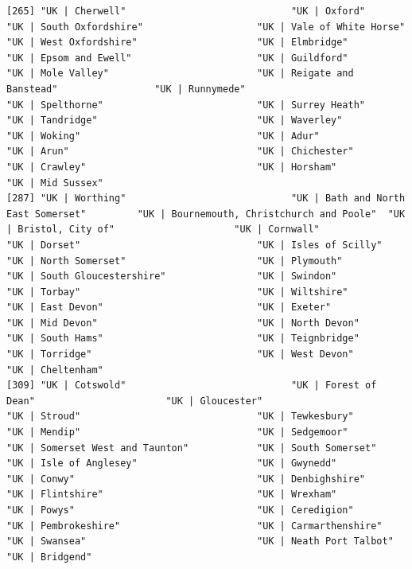 \documentclass[11pt]{article}
\begin{document}
\begin{verbatim}
[265] "UK | Cherwell"                             "UK | Oxford"                               "UK | South Oxfordshire"                    "UK | Vale of White Horse"                  "UK | West Oxfordshire"                     "UK | Elmbridge"                            "UK | Epsom and Ewell"                      "UK | Guildford"                            "UK | Mole Valley"                          "UK | Reigate and Banstead"                 "UK | Runnymede"                            "UK | Spelthorne"                           "UK | Surrey Heath"                         "UK | Tandridge"                            "UK | Waverley"                             "UK | Woking"                               "UK | Adur"                                 "UK | Arun"                                 "UK | Chichester"                           "UK | Crawley"                              "UK | Horsham"                              "UK | Mid Sussex"                          
[287] "UK | Worthing"                             "UK | Bath and North East Somerset"         "UK | Bournemouth, Christchurch and Poole"  "UK | Bristol, City of"                     "UK | Cornwall"                             "UK | Dorset"                               "UK | Isles of Scilly"                      "UK | North Somerset"                       "UK | Plymouth"                             "UK | South Gloucestershire"                "UK | Swindon"                              "UK | Torbay"                               "UK | Wiltshire"                            "UK | East Devon"                           "UK | Exeter"                               "UK | Mid Devon"                            "UK | North Devon"                          "UK | South Hams"                           "UK | Teignbridge"                          "UK | Torridge"                             "UK | West Devon"                           "UK | Cheltenham"                          
[309] "UK | Cotswold"                             "UK | Forest of Dean"                       "UK | Gloucester"                           "UK | Stroud"                               "UK | Tewkesbury"                           "UK | Mendip"                               "UK | Sedgemoor"                            "UK | Somerset West and Taunton"            "UK | South Somerset"                       "UK | Isle of Anglesey"                     "UK | Gwynedd"                              "UK | Conwy"                                "UK | Denbighshire"                         "UK | Flintshire"                           "UK | Wrexham"                              "UK | Powys"                                "UK | Ceredigion"                           "UK | Pembrokeshire"                        "UK | Carmarthenshire"                      "UK | Swansea"                              "UK | Neath Port Talbot"                    "UK | Bridgend"                            

\end{verbatim}
\end{document}
